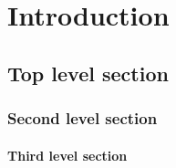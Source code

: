 
\chapter{Introduction}
\label{cha:introduction}

\section{Top level section}

\subsection{Second level section}

\subsubsection{Third level section}

\endinput

